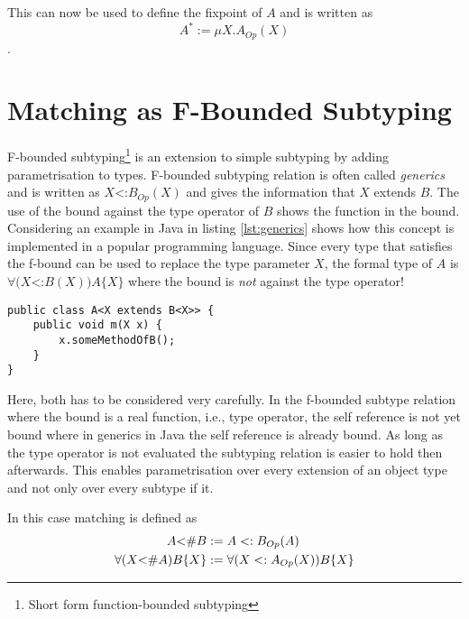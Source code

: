 This can now be used to define the fixpoint of $A$ and is written as \[A^*
:= \mu X.A_{Op}(X)\].

\section{Matching as F-Bounded Subtyping}
F-bounded subtyping\footnote{Short form function-bounded subtyping}
is an extension to simple subtyping by adding parametrisation to
types. F-bounded subtyping relation is often called \emph{generics}
and is written as $X$<:$B_{Op}(X)$ and gives the information that $X$
extends $B$. The use of the bound against the type operator of $B$
shows the function in the bound. Considering an example in Java in
listing \ref{lst:generics} shows how this concept is implemented in a popular
programming language. Since every type that satisfies the f-bound can
be used to replace the type parameter $X$, the formal type of $A$ is
$\forall(X$<:$B(X))A\{X\}$ where the bound is \emph{not} against the 
type operator!

\begin{lstlisting}[caption={Universal quantified f-bound in Java},label={lst:generics}]
public class A<X extends B<X>> {
	public void m(X x) {
		x.someMethodOfB();
	}
}
\end{lstlisting}

Here, both has to be considered very carefully. In the f-bounded subtype
relation where the bound is a real function, i.e., type operator,
the self reference is not yet bound where in generics in Java the self
reference is already bound. As long as the type operator is not evaluated
the subtyping relation is easier to hold then afterwards. This enables 
parametrisation over every extension of an object type and not only over
every subtype if it.

In this case matching is defined as\cite{abadi_subtyping_1996}
\begin{align*}
	A \textnormal{<\#} B & := A <: B_{Op}(A) \\
	\forall (X \textnormal{<\#} A)B\{X\} & := \forall (X <: A_{Op}(X))B\{X\}
\end{align*}

%

